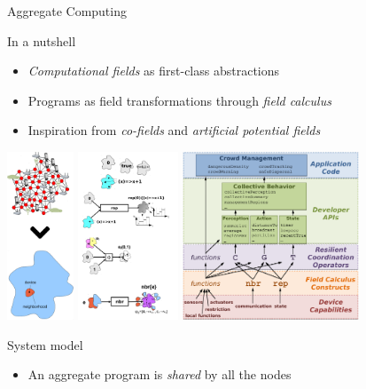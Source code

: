 \documentclass[presentation, 9pt]{beamer}\mode<presentation>{\usetheme{AMSBolognaFC}}
\begin{document}
\begin{frame}[allowframebreaks]{Aggregate Computing}
\begin{alertblock}{In a nutshell}
\begin{itemize}
	\item \emph{Computational fields} as first-class abstractions
	\item Programs as field transformations through \emph{field calculus} 
	\item Inspiration from \emph{co-fields} and \emph{artificial potential fields}
\end{itemize}
\end{alertblock}

\centering
\includegraphics[height=5cm]{img/abstraction.png}
\includegraphics[height=5cm]{img/high-level-examples.png}
\includegraphics[height=5cm]{img/full-stack.png}
\begin{alertblock}{System model}
	\begin{itemize}
		\item An aggregate program is \emph{shared} by all the nodes

\end{itemize}
\end{alertblock}
\end{frame}
\end{document}
